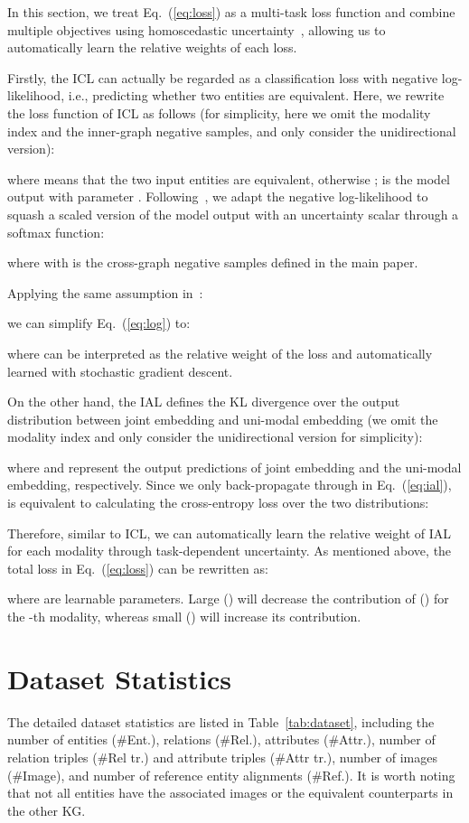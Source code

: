 \documentclass[11pt]{article}
\begin{document}
In this section, we treat Eq.~(\ref{eq:loss}) as a multi-task loss function and combine multiple objectives using homoscedastic uncertainty~\cite{kendall2018multi}, allowing us to automatically learn the relative weights of each loss.

Firstly, the ICL can actually be regarded as a classification loss with negative log-likelihood, i.e., predicting whether two entities are equivalent. Here, we rewrite the loss function of ICL as follows (for simplicity, here we omit the modality index and the inner-graph negative samples, and only consider the unidirectional version):

where  means that the two input entities are equivalent, otherwise ;  is the model output with parameter .
Following~\cite{kendall2018multi}, we adapt the negative log-likelihood to squash a scaled version of the model output with an uncertainty scalar  through a softmax function:

where  with  is the cross-graph negative samples defined in the main paper.

Applying the same assumption in~\cite{kendall2018multi}:

we can simplify Eq.~(\ref{eq:log}) to:

where  can be interpreted as the relative weight of the loss and automatically learned with stochastic gradient descent.

On the other hand, the IAL defines the KL divergence over the output distribution
between joint embedding and uni-modal embedding (we omit the modality index and only consider the unidirectional version for simplicity):

where  and  represent the output predictions of joint embedding and the uni-modal embedding, respectively.
Since we only back-propagate through  in Eq.~(\ref{eq:ial}),  is equivalent to calculating the cross-entropy loss over the two distributions:


Therefore, similar to ICL, we can automatically learn the relative weight of IAL for each modality through task-dependent uncertainty.
As mentioned above, the total loss in Eq.~(\ref{eq:loss}) can be rewritten as:

where  are learnable parameters. Large  () will decrease the contribution of  () for the -th modality, whereas small  () will increase its contribution.

\section{Dataset Statistics}

The detailed dataset statistics are listed in Table~\ref{tab:dataset}, including the number of entities (\#Ent.), relations (\#Rel.), attributes (\#Attr.), number of relation triples (\#Rel tr.) and attribute triples (\#Attr tr.), number of images (\#Image), and number of reference entity alignments (\#Ref.).
It is worth noting that not all entities have the associated images or the equivalent counterparts in the other KG.
 
\end{document}
